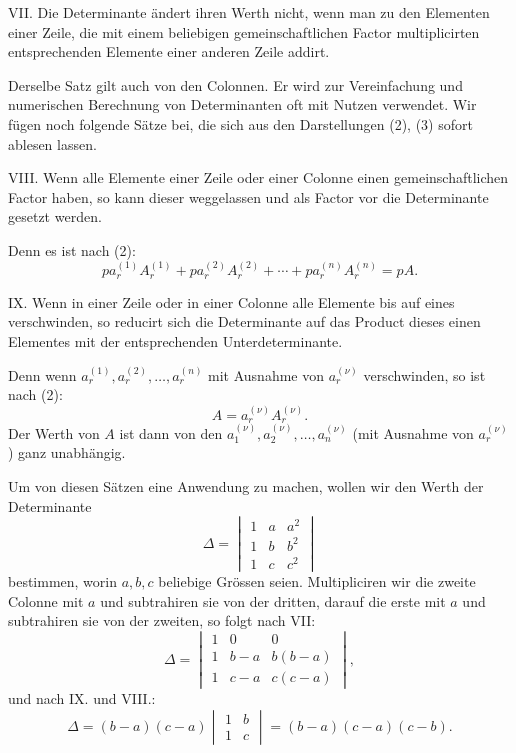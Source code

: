 \documentclass[11pt]{article}
\begin{document}
VII. Die Determinante ändert ihren Werth nicht, wenn man zu den Elementen einer Zeile, die mit einem beliebigen gemeinschaftlichen Factor multiplicirten entsprechenden Elemente einer anderen Zeile addirt.

Derselbe Satz gilt auch von den Colonnen. Er wird zur Vereinfachung und numerischen Berechnung von Determinanten oft mit Nutzen verwendet. Wir fügen noch folgende Sätze bei, die sich aus den Darstellungen (2), (3) sofort ablesen lassen.

VIII. Wenn alle Elemente einer Zeile oder einer Colonne einen gemeinschaftlichen Factor haben, so kann dieser weggelassen und als Factor vor die Determinante gesetzt werden.

Denn es ist nach (2):
\[
p a_r^{(1)}A_r^{(1)}+p a_r^{(2)}A_r^{(2)}+\cdots+p a_r^{(n)}A_r^{(n)}=pA.
\]

IX. Wenn in einer Zeile oder in einer Colonne alle Elemente bis auf eines verschwinden, so reducirt sich die Determinante auf das Product dieses einen Elementes mit der entsprechenden Unterdeterminante.

Denn wenn \(a_r^{(1)},a_r^{(2)},\ldots,a_r^{(n)}\) mit Ausnahme von \(a_r^{(\nu)}\) verschwinden, so ist nach (2):
\[
A=a_r^{(\nu)}A_r^{(\nu)}.
\]
Der Werth von \(A\) ist dann von den \(a_1^{(\nu)},a_2^{(\nu)},\ldots,a_n^{(\nu)}\) (mit Ausnahme von \(a_r^{(\nu)}\)) ganz unabhängig.

Um von diesen Sätzen eine Anwendung zu machen, wollen wir den Werth der Determinante
\[
\Delta=
\begin{vmatrix}
1&a&a^2\\
1&b&b^2\\
1&c&c^2
\end{vmatrix}
\]
bestimmen, worin \(a,b,c\) beliebige Grössen seien. Multipliciren wir die zweite Colonne mit \(a\) und subtrahiren sie von der dritten, darauf die erste mit \(a\) und subtrahiren sie von der zweiten, so folgt nach VII:
\[
\Delta=
\begin{vmatrix}
1&0&0\\
1&b-a&b(b-a)\\
1&c-a&c(c-a)
\end{vmatrix},
\]
und nach IX. und VIII.:
\begin{equation}
\Delta=(b-a)(c-a)
\begin{vmatrix}
1&b\\
1&c
\end{vmatrix}
=(b-a)(c-a)(c-b).
\tag{10}
\end{equation}
\end{document}
